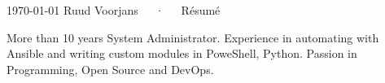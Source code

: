 \documentclass[11pt, letterpaper]{awesome-cv}
\begin{document}
\makecvheader[C]

\makecvfooter
  {\today}
  {Ruud Voorjans~~~·~~~Résumé}
  {\thepage}

\begin{cvparagraph}

More than 10 years System Administrator. Experience in automating with Ansible and writing custom modules in PoweShell, Python. Passion in Programming, Open Source and DevOps.


\end{cvparagraph}

\end{document}
